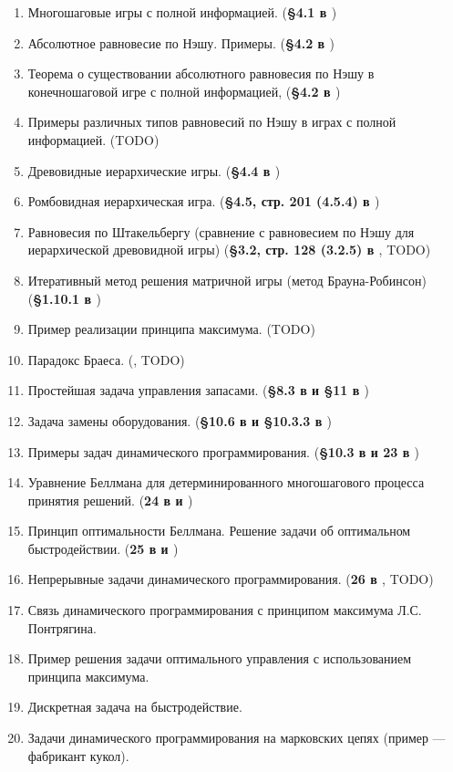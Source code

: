 \documentclass[a4paper,14pt]{extarticle}
\begin{document}
\begin{enumerate}
    \item Многошаговые игры с полной информацией.
        (\textbf{\S 4.1 в \cite{gametheory-2012}})
    \item Абсолютное равновесие по Нэшу. Примеры.
        (\textbf{\S 4.2 в \cite{gametheory-2012}})
    \item Теорема о существовании абсолютного равновесия по Нэшу в конечношаговой игре с полной информацией,
        (\textbf{\S 4.2 в \cite{gametheory-2012}})
    \item Примеры различных типов равновесий по Нэшу в играх с полной информацией.
        (TODO)
    \item Древовидные иерархические игры.
        (\textbf{\S 4.4 в \cite{gametheory-2012}})
    \item Ромбовидная иерархическая игра.
        (\textbf{\S 4.5, стр. 201 (4.5.4) в \cite{gametheory-2012}})
    \item Равновесия по Штакельбергу (сравнение с равновесием по Нэшу для иерархической древовидной игры)
        (\textbf{\S 3.2, стр. 128 (3.2.5) в \cite{gametheory-2012}}, TODO)
    \item Итеративный метод решения матричной игры (метод Брауна-Робинсон)
        (\textbf{\S 1.10.1 в \cite{gametheory-2012}})
    \item Пример реализации принципа максимума.
        (TODO)
    \item Парадокс Браеса.
        (\textbf{\cite{wiki-braess-ru}}, TODO)
    \item Простейшая задача управления запасами.
        (\textbf{\S 8.3 в \cite{vagner-2-1983} и \S 11 в \cite{taha-2002}})
    \item Задача замены оборудования.
        (\textbf{\S 10.6 в \cite{vagner-2-1983} и \S 10.3.3 в \cite{taha-2002}})
    \item Примеры задач динамического программирования.
        (\textbf{\S 10.3 в \cite{taha-2002} и 23 в \cite{sharshukov-xyz}})
    \item Уравнение Беллмана для детерминированного многошагового процесса принятия решений.
        (\textbf{24 в \cite{sharshukov-xyz} и \cite{kuznetsov-dp}})
    \item Принцип оптимальности Беллмана. Решение задачи об оптимальном быстродействии.
        (\textbf{25 в \cite{sharshukov-xyz} и \cite{kuznetsov-dp}})
    \item Непрерывные задачи динамического программирования.
        (\textbf{26 в \cite{sharshukov-xyz}}, TODO)
    \item Связь динамического программирования с принципом максимума Л.С. Понтрягина.
    \item Пример решения задачи оптимального управления с использованием принципа максимума.
    \item Дискретная задача на быстродействие.
    \item Задачи динамического программирования на марковских цепях (пример --- фабрикант кукол).
\end{enumerate}

\custombibliography
\end{document}
